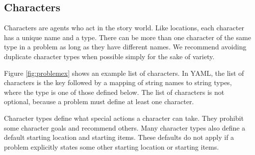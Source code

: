 \documentclass{nilreport}
\begin{document}



\newpage

\subsection{Characters} \label{sec:characters}

Characters are agents who act in the story world. Like locations, each character has a unique name and a type. There can be more than one character of the same type in a problem as long as they have different names. We recommend avoiding duplicate character types when possible simply for the sake of variety.

Figure \ref{fig:problemex} shows an example list of characters. In YAML, the list of characters is the key  followed by a mapping of string names to string types, where the type is one of those defined below. The list of characters is not optional, because a problem must define at least one character.

Character types define what special actions a character can take. They prohibit some character goals and recommend others. Many character types also define a default starting location and starting items. These defaults do not apply if a problem explicitly states some other starting location or starting items.
\end{document}
